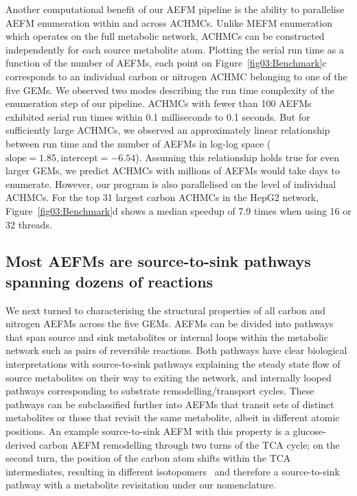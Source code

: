 \documentclass[12pt]{article}
\begin{document}
Another computational benefit of our AEFM pipeline is the ability to
parallelise AEFM enumeration within and across ACHMCs. Unlike MEFM
enumeration which operates on the full metabolic network, ACHMCs can be
constructed independently for each source metabolite atom. Plotting the
serial run time as a function of the number of AEFMs, each point on
Figure~\ref{fig03:Benchmark}c corresponds to an individual carbon or
nitrogen ACHMC belonging to one of the five GEMs. We observed two modes
describing the run time complexity of the enumeration step of our
pipeline. ACHMCs with fewer than 100 AEFMs exhibited serial run times
within 0.1 milliseconds to 0.1 seconds. But for sufficiently large ACHMCs,
we observed an approximately linear relationship between run time and the
number of AEFMs in log-log space ($\text{slope}=1.85,
\text{intercept}=-6.54$). Assuming this relationship holds true for even
larger GEMs, we predict ACHMCs with millions of AEFMs would take days to
enumerate. However, our program is also parallelised on the level of
individual ACHMCs. For the top 31 largest carbon ACHMCs in the HepG2
network, Figure~\ref{fig03:Benchmark}d shows a median speedup of 7.9 times
when using 16 or 32 threads.

\subsection*{Most AEFMs are source-to-sink pathways spanning dozens of reactions}

We next turned to characterising the structural properties of all carbon
and nitrogen AEFMs across the five GEMs. AEFMs can be divided into
pathways that span source and sink metabolites or internal loops within
the metabolic network such as pairs of reversible reactions. Both pathways
have clear biological interpretations with source-to-sink pathways
explaining the steady state flow of source metabolites on their way to
exiting the network, and internally looped pathways corresponding to
substrate remodelling/transport cycles. These pathways can be
subclassified further into AEFMs that transit sets of distinct metabolites
or those that revisit the same metabolite, albeit in different atomic
positions. An example source-to-sink AEFM with this property is
a glucose-derived carbon AEFM remodelling through two turns of the TCA
cycle; on the second turn, the position of the carbon atom shifts within
the TCA intermediates, resulting in different
isotopomers~\citep{DuanLikun20221tas} and therefore a source-to-sink
pathway with a metabolite revisitation under our nomenclature. 
\end{document}
